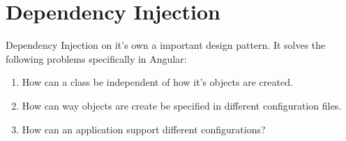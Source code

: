 \section{ Dependency Injection }
\maketitle{}

Dependency Injection on it's own a important design pattern. It solves the
following problems specifically in Angular:
\begin{enumerate}
  \item How can a class be independent of how it's objects are created.
  \item How can way objects are create be specified in different configuration
  files.
  \item How can an application support different configurations? 
\end{enumerate}

